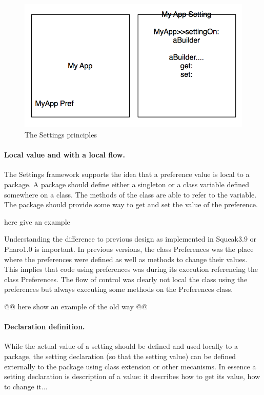 \documentclass[a4paper,10pt,twoside]{book}
\begin{document}
\begin{figure}[tbh]
\begin{center}
\includegraphics[scale=0.3]{Principles}
\caption{The Settings principles}
\end{center}
\end{figure}

\paragraph{Local value and with a local flow.}

The Settings framework supports the idea that a preference value is local to a package. A package should define either a singleton or a class variable defined somewhere on a class. The methods of the class are able to refer to the variable. The package should provide some way to get and set the value of the preference.

here give an example

Understanding the difference to previous design as implemented in Squeak3.9 or Pharo1.0 is important.
In previous versions, the class Preferences was the place where the preferences were defined as well as methods to change their values. This implies that code using preferences was during its execution referencing the class Preferences.
The flow of control was clearly not local the class using the preferences but always executing some methods on the Preferences class.



@@
here show an example of the old way
@@


\paragraph{Declaration definition.}
While the actual value of a setting should be defined and used locally to a package, the setting declaration (so that the setting value) can be defined externally to the package using class extension or other mecanisms.
In essence a setting declaration is description of a value: it describes how to get its value, how to change it...
\end{document}
